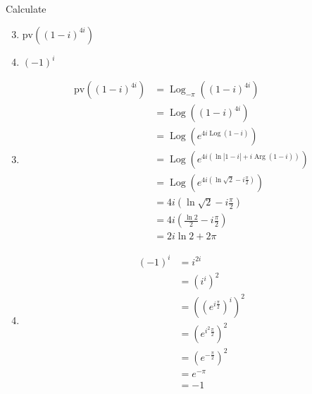 \documentclass[fleqn, a4paper, 11pt, oneside]{amsart}
\theoremstyle{definition}
\theoremstyle{theorem}
\DeclareMathOperator{\Arg}{Arg}
\DeclareMathOperator{\Log}{Log}
\begin{document}
\setcounter{question}{2}
\begin{question}
	Calculate
	\begin{enumerate}
		\setcounter{enumi}{2}
		\item $\mathrm{pv}\left( (1 - i)^{4 i} \right)$
		\item $(-1)^i$
	\end{enumerate}
\end{question}

\begin{solution}
	\begin{enumerate}[leftmargin=*]
		\setcounter{enumi}{2}
		\item
			\begin{align*}
				\mathrm{pv}\left( (1 - i)^{4 i} \right) & = \Log_{-\pi}\left( (1 - i)^{4 i} \right)                                  \\
                                                                        & = \Log\left( (1 - i)^{4 i} \right)                                         \\
                                                                        & = \Log\left( e^{4 i \Log(1 - i)} \right)                                   \\
                                                                        & = \Log\left( e^{4 i \left( \ln|1 - i| + i \Arg(1 - i) \right)} \right)     \\
                                                                        & = \Log\left( e^{4 i \left( \ln \sqrt{2} - i \frac{\pi}{2} \right)} \right) \\
                                                                        & = 4 i \left( \ln \sqrt{2} - i \frac{\pi}{2} \right)                        \\
                                                                        & = 4 i \left( \frac{\ln 2}{2} - i \frac{\pi}{2} \right)                     \\
                                                                        & = 2 i \ln 2 + 2 \pi
			\end{align*}
		\item
			\begin{align*}
				(-1)^i & = i^{2 i}                                               \\
                                       & = \left( i^i \right)^2                                  \\
                                       & = \left( \left( e^{i \frac{\pi}{2}} \right)^i \right)^2 \\
                                       & = \left( e^{i^2 \frac{\pi}{2}} \right)^2                \\
                                       & = \left( e^{-\frac{\pi}{2}} \right)^2                   \\
                                       & = e^{-\pi}                                              \\
                                       & = -1
			\end{align*}
	\end{enumerate}
\end{solution}
\end{document}
